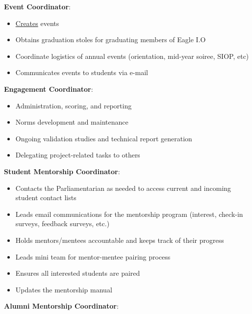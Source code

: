 \documentclass[
]{book}
\providecommand{\tightlist}{%
  \setlength{\itemsep}{0pt}\setlength{\parskip}{0pt}}
\begin{document}
\textbf{Event Coordinator}:

\begin{itemize}
\tightlist
\item
  \href{https://docs.google.com/document/d/1IjvTktndY3jRej4su-R3zDifvfWRX7zHzC9pE9od_3M/edit?usp=sharing}{Creates} events
\item
  Obtains graduation stoles for graduating members of Eagle I.O
\item
  Coordinate logistics of annual events (orientation, mid-year soiree, SIOP, etc)
\item
  Communicates events to students via e-mail
\end{itemize}

\textbf{Engagement Coordinator}:

\begin{itemize}
\tightlist
\item
  Administration, scoring, and reporting
\item
  Norms development and maintenance
\item
  Ongoing validation studies and technical report generation\\
\item
  Delegating project-related tasks to others
\end{itemize}

\textbf{Student Mentorship Coordinator}:

\begin{itemize}
\tightlist
\item
  Contacts the Parliamentarian as needed to access current and incoming student contact lists\\
\item
  Leads email communications for the mentorship program (interest, check-in surveys, feedback surveys, etc.)\\
\item
  Holds mentors/mentees accountable and keeps track of their progress\\
\item
  Leads mini team for mentor-mentee pairing process
\item
  Ensures all interested students are paired\\
\item
  Updates the mentorship manual
\end{itemize}

\textbf{Alumni Mentorship Coordinator}:
\end{document}
